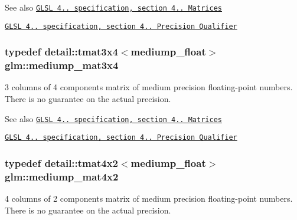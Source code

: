 \begin{DoxySeeAlso}{\-See also}
\href{http://www.opengl.org/registry/doc/GLSLangSpec.4.20.8.pdf}{\tt \-G\-L\-S\-L 4.. specification, section 4.. \-Matrices} 

\href{http://www.opengl.org/registry/doc/GLSLangSpec.4.20.8.pdf}{\tt \-G\-L\-S\-L 4.. specification, section 4.. \-Precision \-Qualifier} 
\end{DoxySeeAlso}
\hypertarget{group__core__precision_gaa530d8f06a8f1187cd1e0c2ce46cac42}{
\subsubsection[{mediump\-\_\-mat3x4}]{\setlength{\rightskip}{0pt plus 5cm}typedef detail\-::tmat3x4$<$mediump\-\_\-float$>$ {\bf glm\-::mediump\-\_\-mat3x4}}}\label{group__core__precision_gaa530d8f06a8f1187cd1e0c2ce46cac42}
3 columns of 4 components matrix of medium precision floating-\/point numbers. \-There is no guarantee on the actual precision.

\begin{DoxySeeAlso}{\-See also}
\href{http://www.opengl.org/registry/doc/GLSLangSpec.4.20.8.pdf}{\tt \-G\-L\-S\-L 4.. specification, section 4.. \-Matrices} 

\href{http://www.opengl.org/registry/doc/GLSLangSpec.4.20.8.pdf}{\tt \-G\-L\-S\-L 4.. specification, section 4.. \-Precision \-Qualifier} 
\end{DoxySeeAlso}
\hypertarget{group__core__precision_gad8c4b5a61db5087e32506b2022442edd}{
\subsubsection[{mediump\-\_\-mat4x2}]{\setlength{\rightskip}{0pt plus 5cm}typedef detail\-::tmat4x2$<$mediump\-\_\-float$>$ {\bf glm\-::mediump\-\_\-mat4x2}}}\label{group__core__precision_gad8c4b5a61db5087e32506b2022442edd}
4 columns of 2 components matrix of medium precision floating-\/point numbers. \-There is no guarantee on the actual precision.

